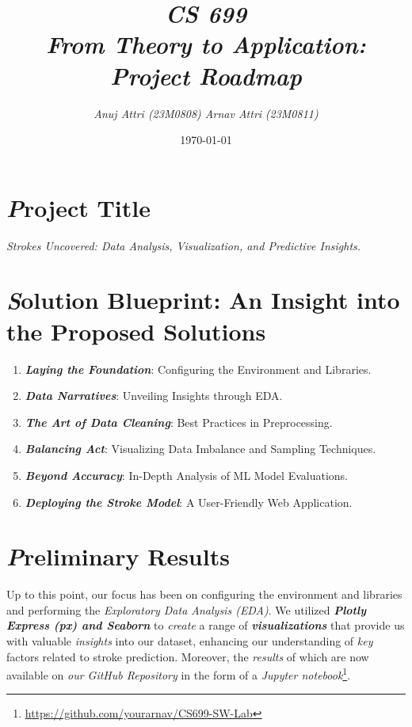 \documentclass{article}
\begin{document}
\title{\textit{CS 699} \\ \textit{From Theory to Application: Project Roadmap}}


\author{
 \textit{ Anuj Attri (23M0808)  Arnav Attri} \textit{(23M0811) }\\}


\date{\today} %
\maketitle

\section*{{\fontsize{18}{30}\selectfont \textit{P}}roject Title }
\textit{  {Strokes Uncovered:} Data Analysis, Visualization, and Predictive Insights.}

\section{{\textit{\fontsize{18}{30}\selectfont S}olution Blueprint: An Insight into the Proposed Solutions}}

\begin{enumerate}
  \item {\textit{\textbf{Laying the Foundation}}: Configuring the Environment and Libraries.}
  \item {\textit{\textbf{Data Narratives}}: Unveiling Insights through EDA.}
  \item {\textit{\textbf{The Art of Data Cleaning}}: Best Practices in Preprocessing.}
  \item {\textit{\textbf{Balancing Act}}: Visualizing Data Imbalance and Sampling Techniques.}
  \item {\textit{\textbf{Beyond Accuracy}}: In-Depth Analysis of ML Model Evaluations.}
  \item {\textit{\textbf{Deploying the Stroke Model}}: A User-Friendly Web Application.}
 
\end{enumerate}

\section{{\textit{\fontsize{18}{30}\selectfont P}reliminary Results}}

Up to this point, our focus has been on configuring the environment and libraries and performing the \textit{Exploratory Data Analysis (EDA)}. We utilized \textit{\textbf{Plotly Express (px) and Seaborn}} to \textit{create} a range of \textit{\textbf{visualizations}} that provide us with valuable \textit{insights} into our dataset, enhancing our understanding of \textit{key} factors related to stroke prediction. Moreover, the \textit{results} of which are now available on \textit{our GitHub Repository} in the form of a \textit{Jupyter notebook}\footnote{\url{https://github.com/yourarnav/CS699-SW-Lab}}.\\
\end{document}
